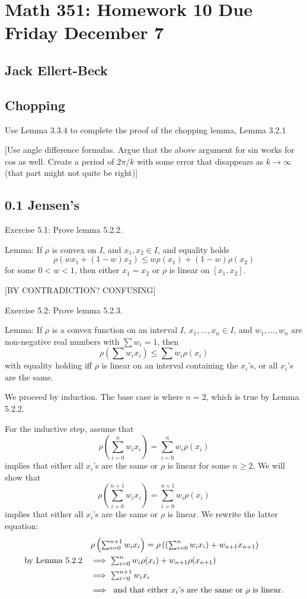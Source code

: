\documentclass[11pt]{article}
\begin{document}
\setlength{\parindent}{0pt}
\setlength{\parskip}{9pt}


\section*{Math 351: Homework 10  Due Friday December 7}
\subsection*{Jack Ellert-Beck}

\bigskip

\subsection*{Chopping}

Use Lemma 3.3.4 to complete the proof of the chopping lemma, Lemma 3.2.1

[Use angle difference formulas. Argue that the above argument for sin works
for cos as well. Create a period of $2\pi/k$ with some error that
disappears as $k\to\infty$ (that part might not quite be right)]

\subsection*{0.1 Jensen's}

Exercise 5.1: Prove lemma 5.2.2.

Lemma: If $\rho$ is convex on $I$, and $x_1,x_2\in I$, and equality holds
\[
    \rho(wx_1+(1-w)x_2)\leq w\rho(x_1)+(1-w)\rho(x_2)
\]
for some $0<w<1$, then either $x_1=x_2$ or $\rho$ is linear on $[x_1,x_2]$.

[BY CONTRADICTION? CONFUSING]

Exercise 5.2: Prove lemma 5.2.3.

Lemma: If $\rho$ is a convex function on an interval $I$,
$x_1,\ldots,x_n\in I$,
and $w_1,\ldots,w_n$ are non-negative real numbers with $\sum w_i=1$, then
\[
    \rho\left(\sum w_ix_i\right)\leq\sum w_i\rho(x_i)
\]
with equality holding iff $\rho$ is linear on an interval containing the
$x_i$'s, or all $x_i$'s are the same.

We proceed by induction. The base case is where $n=2$, which is true by
Lemma 5.2.2.

For the inductive step, assume that 
\[
    \rho\left(\sum_{i=0}^n w_ix_i\right)=\sum_{i=0}^n w_i\rho(x_i)
\]
implies that either all $x_i$'s are the same or $\rho$ is linear 
for some $n\geq2$. We will show that
\[
    \rho\left(\sum_{i=0}^{n+1} w_ix_i\right)=\sum_{i=0}^{n+1} w_i\rho(x_i)
\]
implies that either all $x_i$'s are the same or $\rho$ is linear.
We rewrite the latter equation:
\[
\def\arraystretch{1.5}
\begin{array}{rl}
& \rho\left(\sum_{i=0}^{n+1}w_ix_i\right) =
    \rho\left(\left(\sum_{i=0}^nw_ix_i\right)+w_{n+1}x_{n+1}\right) \\
\textrm{by Lemma 5.2.2}&\implies \sum_{i=0}^nw_i\rho(x_i)+w_{n+1}\rho(x_{n+1}) \\
&\implies \sum_{i=0}^{n+1}w_ix_i \\
&\implies \textrm{ and that either $x_i$'s are the same or $\rho$ is linear.}
\end{array}
\]
\end{document}
